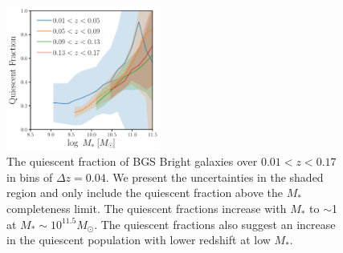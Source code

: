\begin{figure}
\begin{center}
    \includegraphics[width=0.45\textwidth]{figs/qf_bgs_bright.pdf} 
    \caption{
        The quiescent fraction of BGS Bright galaxies over $0.01 < z < 0.17$ in
        bins of $\Delta z =0.04$.
        We present the uncertainties in the shaded region and only include  
        the quiescent fraction above the $M_*$ completeness limit. 
        The quiescent fractions increase with $M_*$ to $\sim$1 at
        $M_*\sim10^{11.5}M_\odot$. 
        The quiescent fractions also suggest an increase in the quiescent
        population with lower redshift at low $M_*$.
    }\label{fig:qf}
\end{center}
\end{figure}

